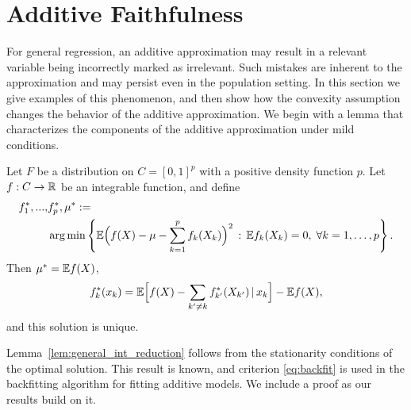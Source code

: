 
\section{Additive Faithfulness}
\label{sec:additivefaithful}

For general regression, an additive approximation may result in a
relevant variable being incorrectly marked as irrelevant. Such
mistakes are inherent to the approximation and may persist even in
the population setting.  In this section we give
examples of this phenomenon, and then show how the convexity
assumption
changes the behavior of the additive approximation. We begin
with a lemma that characterizes the components of the additive approximation under mild conditions.



\begin{lemma}
\label{lem:general_int_reduction}
Let $F$ be a distribution on $C=[0,1]^p$ with a positive density
function $p$. Let $f: C \rightarrow {\mathbb R}$ be an integrable function,
and define 
\begin{align*}
f^*_1,...,&f^*_p, \mu^* :=  \\
&\arg\min \left\{ {\mathbb E} \Bigl( f(X) - \mu - \sum_{k=1}^p f_k(X_k)\Bigr)^2 \,:\,
{\mathbb E} f_k(X_k) = 0,\; \forall k=1,\ldots, p \right\}.
\end{align*}
Then $\mu^* = {\mathbb E} f(X)$, 
\begin{equation}
\label{eq:backfit}
f^*_k(x_k) = {\mathbb E}\Bigl[ f(X) - \sum_{k' \neq k} f^*_{k'}(X_{k'}) {\,|\,}
x_k\Bigr] - {\mathbb E} f(X), 
\end{equation}
and this solution is unique.
\end{lemma}


Lemma~\ref{lem:general_int_reduction} follows from the stationarity
conditions of the optimal solution.   This result is known, and
criterion \eqref{eq:backfit} is used in the backfitting
algorithm for fitting additive models.   We include 
a proof as our results build on it.

